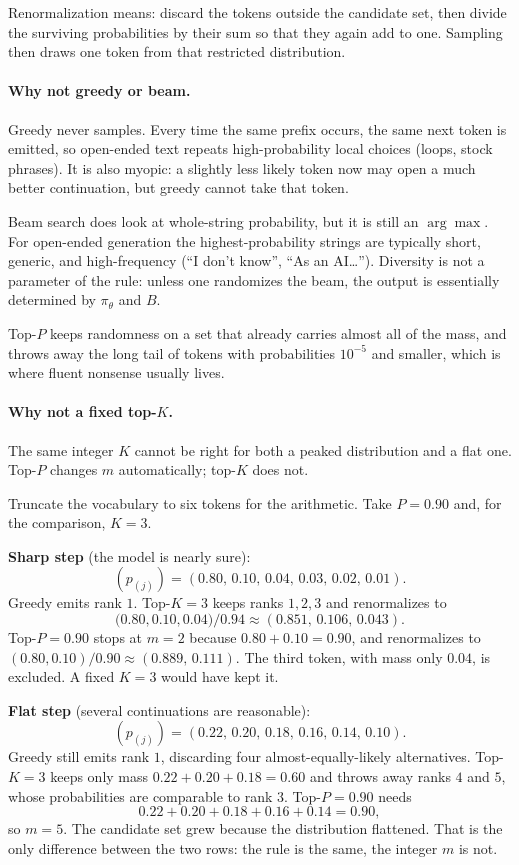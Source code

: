 \documentclass[11pt,a4paper]{article}
\theoremstyle{definition}
\begin{document}
Renormalization means: discard the tokens outside the candidate set, then divide the surviving probabilities by their sum so that they again add to one. Sampling then draws one token from that restricted distribution.

\paragraph{Why not greedy or beam.}
Greedy never samples. Every time the same prefix occurs, the same next token is emitted, so open-ended text repeats high-probability local choices (loops, stock phrases). It is also myopic: a slightly less likely token now may open a much better continuation, but greedy cannot take that token.

Beam search does look at whole-string probability, but it is still an \(\arg\max\). For open-ended generation the highest-probability strings are typically short, generic, and high-frequency (``I don't know'', ``As an AI\ldots''). Diversity is not a parameter of the rule: unless one randomizes the beam, the output is essentially determined by \(\pi_\theta\) and \(B\).

Top-\(P\) keeps randomness on a set that already carries almost all of the mass, and throws away the long tail of tokens with probabilities \(10^{-5}\) and smaller, which is where fluent nonsense usually lives.

\paragraph{Why not a fixed top-\(K\).}
The same integer \(K\) cannot be right for both a peaked distribution and a flat one. Top-\(P\) changes \(m\) automatically; top-\(K\) does not.

\begin{example}\label{ex:spr2025-nlp-nucleus}
Truncate the vocabulary to six tokens for the arithmetic. Take \(P=0.90\) and, for the comparison, \(K=3\).

\medskip
\noindent\textbf{Sharp step} (the model is nearly sure):
\[
(p_{(j)})=(0.80,\,0.10,\,0.04,\,0.03,\,0.02,\,0.01).
\]
Greedy emits rank \(1\). Top-\(K=3\) keeps ranks \(1,2,3\) and renormalizes to
\[
\bigl(0.80,0.10,0.04\bigr)/0.94
\approx(0.851,\,0.106,\,0.043).
\]
Top-\(P=0.90\) stops at \(m=2\) because \(0.80+0.10=0.90\), and renormalizes to \((0.80,0.10)/0.90\approx(0.889,\,0.111)\). The third token, with mass only \(0.04\), is excluded. A fixed \(K=3\) would have kept it.

\medskip
\noindent\textbf{Flat step} (several continuations are reasonable):
\[
(p_{(j)})=(0.22,\,0.20,\,0.18,\,0.16,\,0.14,\,0.10).
\]
Greedy still emits rank \(1\), discarding four almost-equally-likely alternatives. Top-\(K=3\) keeps only mass \(0.22+0.20+0.18=0.60\) and throws away ranks \(4\) and \(5\), whose probabilities are comparable to rank \(3\). Top-\(P=0.90\) needs
\[
0.22+0.20+0.18+0.16+0.14=0.90,
\]
so \(m=5\). The candidate set grew because the distribution flattened. That is the only difference between the two rows: the rule is the same, the integer \(m\) is not.
\end{example}
\end{document}
